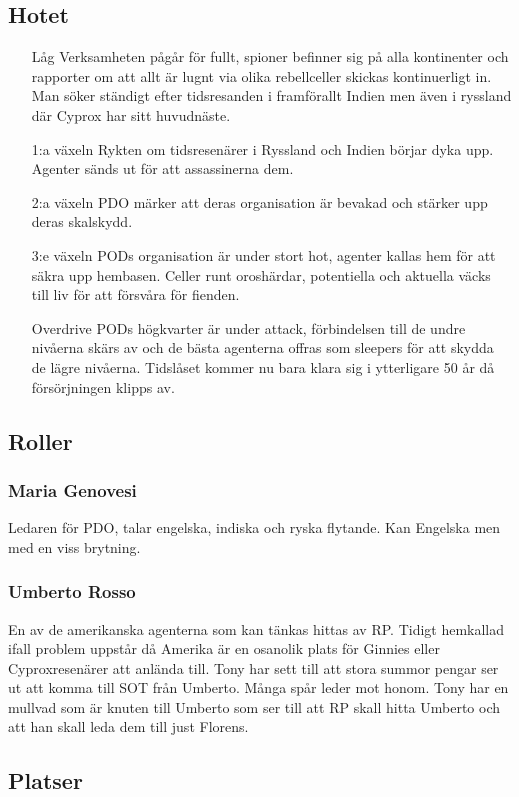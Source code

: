 \documentclass[a5paper,10pt]{report}
\begin{document}
\subsection{Hotet}
\begin{itemize}
  \item[Låg] Verksamheten pågår för fullt, spioner befinner sig på alla kontinenter och rapporter om att allt är lugnt via olika rebellceller skickas kontinuerligt in. Man söker ständigt efter tidsresanden i framförallt Indien men även i ryssland där Cyprox har sitt huvudnäste.
  \item[1:a växeln] Rykten om tidsresenärer i Ryssland och Indien börjar dyka upp. Agenter sänds ut för att assassinerna dem.
  \item[2:a växeln] PDO märker att deras organisation är bevakad och stärker upp deras skalskydd.
  \item[3:e växeln] PODs organisation är under stort hot, agenter kallas hem för att säkra upp hembasen. Celler runt oroshärdar, potentiella och aktuella väcks till liv för att försvåra för fienden.
  \item[Overdrive] PODs högkvarter är under attack, förbindelsen till de undre nivåerna skärs av och de bästa agenterna offras som sleepers för att skydda de lägre nivåerna. Tidslåset kommer nu bara klara sig i ytterligare 50 år då försörjningen klipps av.
\end{itemize}
\subsection{Roller}
\subsubsection{Maria Genovesi}
Ledaren för PDO, talar engelska, indiska och ryska flytande. Kan Engelska men med en viss brytning.
\subsubsection{Umberto Rosso}
En av de amerikanska agenterna som kan tänkas hittas av RP. Tidigt hemkallad ifall problem uppstår då Amerika är en osanolik plats för Ginnies eller Cyproxresenärer att anlända till. Tony har sett till att stora summor pengar ser ut att komma till SOT från Umberto. Många spår leder mot honom. Tony har en mullvad som är knuten till Umberto som ser till att RP skall hitta Umberto och att han skall leda dem till just Florens.
\subsection{Platser}
\end{document}
